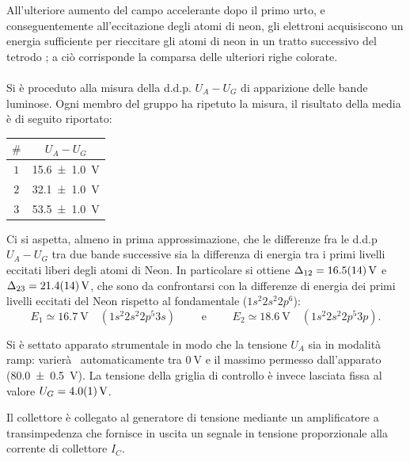 		All'ulteriore aumento del campo accelerante dopo il
		primo urto, e conseguentemente all'eccitazione degli
		atomi di neon, gli elettroni acquisiscono un energia
		sufficiente per rieccitare gli atomi
		di neon in un tratto successivo del tetrodo ;
		a ciò corrisponde la comparsa delle ulteriori righe colorate.
\paragraph{}
	Si è proceduto alla misura della d.d.p. $U_A-U_G$ di apparizione delle bande luminose. Ogni membro del gruppo ha ripetuto la misura, il risultato della media è di seguito riportato:

	\begin{table}[H]
 		\centering
		\begin{tabular}{cc}
 			\toprule
 			$\#$  &  $U_A- U_G$\\
  			\midrule
  			$1$ & \SI{15.6 \pm 1.0}{\volt}\\
  			$2$ &  \SI{32.1 \pm 1.0}{\volt}\\
  			$3$ & \SI{53.5 \pm 1.0}{\volt}\\
  			\bottomrule
 		\end{tabular}
	\label{tab:a}
	\end{table}



	Ci si aspetta, almeno in prima approssimazione, che le differenze fra le d.d.p $U_A-U_G$ tra due bande successive sia la differenza di energia tra i primi livelli eccitati liberi degli atomi di Neon.
	In particolare si ottiene $\Delta_{12} = \SI{16.5 \pm 1.4}{\volt}$ e $\Delta_{23} = \SI{21.4 \pm 1.4}{\volt}$, che sono da confrontarsi con la differenze di energia dei primi livelli eccitati del Neon rispetto al fondamentale ($1s^2 2s^2 2p^6$):
	$$E_1 \simeq \SI{16.7}{\volt} \quad (1s^2 2s^2 2p^5 3s) \qquad \text{ e } \qquad E_2 \simeq \SI{18.6}{\volt} \quad (1s^2 2s^2 2p^5 3p).$$

\bigskip
	Si è settato apparato strumentale in modo che
	la tensione $U_A$ sia in modalità  ramp: varierà  automaticamente tra $\SI{0}{\volt}$ e il massimo permesso dall'apparato (\SI{80.0 \pm 0.5}{\volt}). La tensione della griglia di controllo è invece lasciata fissa al valore $U_G = \SI{4.0 \pm 0.1}{\volt}$.

Il collettore è collegato al generatore di tensione mediante un amplificatore a transimpedenza
	che fornisce in uscita un segnale in tensione proporzionale alla corrente di collettore $I_C$.

